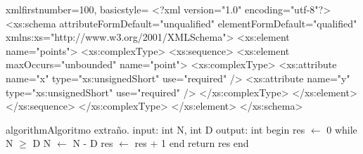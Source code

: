 \begin{sourcecodep}{xml}{firstnumber=100, basicstyle={\fontsize{7}{10}\selectfont\ttfamily}}{}
<?xml version="1.0" encoding="utf-8"?>
<xs:schema attributeFormDefault="unqualified" elementFormDefault="qualified"
   xmlns:xs="http://www.w3.org/2001/XMLSchema">
  <xs:element name="points">
    <xs:complexType>
      <xs:sequence>
        <xs:element maxOccurs="unbounded" name="point">
          <xs:complexType>
            <xs:attribute name="x" type="xs:unsignedShort" use="required" />
            <xs:attribute name="y" type="xs:unsignedShort" use="required" />
          </xs:complexType>
        </xs:element>
      </xs:sequence>
    </xs:complexType>
  </xs:element>
</xs:schema>
\end{sourcecodep}

\newpage
\begin{sourcecode}{algorithm}{Algoritmo extraño.}
input: int N, int D
output: int
begin
	res $\gets$ 0
	while N $\geq$ D 
		N $\gets$ N - D
		res $\gets$ res + 1      
	end
	return res
end    
\end{sourcecode}